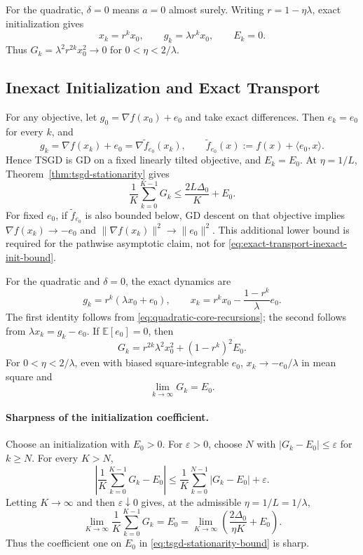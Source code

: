 For the quadratic, $\delta=0$ means $a=0$ almost surely.
Writing $r=1-\eta\lambda$, exact initialization gives
\begin{equation}
\label{eq:quadratic-exact-gd}
x_k=r^kx_0,\qquad g_k=\lambda r^kx_0,\qquad E_k=0.
\end{equation}
Thus $G_k=\lambda^2r^{2k}x_0^2\to0$ for $0<\eta<2/\lambda$.

\subsection{Inexact Initialization and Exact Transport}
\label{subsec:inexact-init-exact-transport}

For any objective, let $g_0=\nabla f(x_0)+e_0$ and take exact
differences. Then $e_k=e_0$ for every $k$, and
\[
g_k=\nabla f(x_k)+e_0=\nabla\widetilde f_{e_0}(x_k),
\qquad \widetilde f_{e_0}(x):=f(x)+\langle e_0,x\rangle.
\]
Hence TSGD is GD on a fixed linearly tilted objective, and $E_k=E_0$.
At $\eta=1/L$, Theorem~\ref{thm:tsgd-stationarity} gives
\begin{equation}
\label{eq:exact-transport-inexact-init-bound}
\frac1K\sum_{k=0}^{K-1}G_k\leq\frac{2L\Delta_0}{K}+E_0.
\end{equation}
For fixed $e_0$, if $\widetilde f_{e_0}$ is also bounded below,
GD descent on that objective implies
$\nabla f(x_k)\to-e_0$ and
$\|\nabla f(x_k)\|^2\to\|e_0\|^2$.
This additional lower bound is required for the pathwise asymptotic
claim, not for \eqref{eq:exact-transport-inexact-init-bound}.

For the quadratic and $\delta=0$, the exact dynamics are
\begin{equation}
\label{eq:quadratic-tilted-trajectory}
g_k=r^k(\lambda x_0+e_0),\qquad
x_k=r^kx_0-\frac{1-r^k}{\lambda}e_0.
\end{equation}
The first identity follows from \eqref{eq:quadratic-core-recursions};
the second follows from $\lambda x_k=g_k-e_0$.
If $\mathbb E[e_0]=0$, then
\begin{equation}
\label{eq:quadratic-centered-init-stationarity}
G_k=r^{2k}\lambda^2x_0^2+(1-r^k)^2E_0.
\end{equation}
For $0<\eta<2/\lambda$, even with biased square-integrable $e_0$,
$x_k\to-e_0/\lambda$ in mean square and
\begin{equation}
\label{eq:quadratic-init-residual}
\lim_{k\to\infty}G_k=E_0.
\end{equation}
\paragraph{Sharpness of the initialization coefficient.}
Choose an initialization with $E_0>0$.
For $\varepsilon>0$, choose $N$ with $|G_k-E_0|\leq\varepsilon$
for $k\geq N$. For every $K>N$,
\[
\left|\frac1K\sum_{k=0}^{K-1}G_k-E_0\right|
\leq\frac1K\sum_{k=0}^{N-1}|G_k-E_0|+\varepsilon.
\]
Letting $K\to\infty$ and then $\varepsilon\downarrow0$ gives,
at the admissible $\eta=1/L=1/\lambda$,
\[
\lim_{K\to\infty}\frac1K\sum_{k=0}^{K-1}G_k
=E_0
=\lim_{K\to\infty}\left(\frac{2\Delta_0}{\eta K}+E_0\right).
\]
Thus the coefficient one on $E_0$ in
\eqref{eq:tsgd-stationarity-bound} is sharp.

